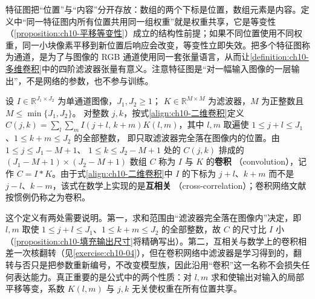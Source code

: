 \documentclass[../../main.tex]{subfiles}
\begin{document}
\begin{remark}
特征图把“位置”与“内容”分开存放：数组的两个下标是位置，数组元素是内容。定义中“同一特征图内所有位置共用同一组权重”就是权重共享，它是等变性（\cref{proposition:ch10-平移等变性}）成立的结构性前提；如果不同位置使用不同权重，同一小块像素平移到新位置后响应会改变，等变性立即失效。把多个特征图称为通道，是为了与图像的 RGB 通道使用同一套张量语言，从而让\cref{definition:ch10-多维卷积}中的四阶滤波器张量有意义。注意特征图是“对一幅输入图像的一层输出”，不是网络的参数，也不参与训练。
\end{remark}

\begin{definition}[卷积与互相关]\label{definition:ch10-卷积}
设 $I\in\mathbb{R}^{J_1\times J_2}$ 为单通道图像，$J_1,J_2\geqslant1$；
$K\in\mathbb{R}^{M\times M}$ 为滤波器，$M$ 为正整数且 $M\leqslant\min\{J_1,J_2\}$。
对整数 $j,k$，按式\eqref{align:ch10-二维卷积}定义
$C(j,k)=\sum_{l}\sum_{m}I(j+l,\,k+m)K(l,m)$，其中 $l,m$ 取遍使
$1\leqslant j+l\leqslant J_1$、$1\leqslant k+m\leqslant J_2$ 的全部整数，
即只取滤波器完全落在图像内的位置。由 $1\leqslant j\leqslant J_1-M+1$、
$1\leqslant k\leqslant J_2-M+1$ 处的 $C(j,k)$ 排成的
$(J_1-M+1)\times(J_2-M+1)$ 数组 $C$ 称为 $I$ 与 $K$ 的\textbf{卷积}
（convolution），记作 $C=I*K$。由于式\eqref{align:ch10-二维卷积}中 $I$ 的下标为
$j+l$、$k+m$ 而不是 $j-l$、$k-m$，该式在数学上实现的是\textbf{互相关}
（cross-correlation）；卷积网络文献按惯例仍称之为卷积。
\end{definition}

\begin{remark}
这个定义有两处需要说明。第一，求和范围由“滤波器完全落在图像内”决定，即 $l,m$ 取使 $1\leqslant j+l\leqslant J_1$、$1\leqslant k+m\leqslant J_2$ 的全部整数，故 $C$ 的尺寸比 $I$ 小（\cref{proposition:ch10-填充输出尺寸}将精确写出）。第二，互相关与数学上的卷积相差一次核翻转（见\cref{exercise:ch10-04}），但在卷积网络中滤波器是学习得到的，翻转与否只是把参数重新编号，不改变模型族，因此沿用“卷积”这一名称不会损失任何表达能力。真正重要的是公式中的两个性质：对 $l,m$ 求和使输出对输入的局部平移等变，系数 $K(l,m)$ 与 $j,k$ 无关使权重在所有位置共享。
\end{remark}
\end{document}
